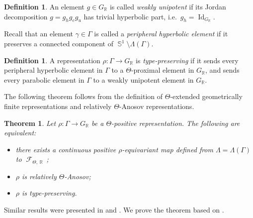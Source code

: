 \documentclass{amsart}
\theoremstyle{plain}
\newtheorem{theorem}[proposition]{Theorem}
\theoremstyle{definition}
\newtheorem{definition}[proposition]{Definition}
\DeclareMathOperator{\Id}{Id}
\DeclareMathOperator{\Fc}{\mathcal{F}}
\DeclareMathOperator{\Rb}{{\mathbb{R}}}
\DeclareMathOperator{\Sb}{\mathbb{S}}
\newcommand{\1}{\mathbf{1}}
\begin{document}
\begin{definition}\label{definition: weakly unipotent}
    An element $g\in G_{\Rb}$ is called \emph{weakly unipotent} if its Jordan decomposition $g= g_h g_e g_u$ has trivial hyperbolic part, i.e.\ $g_h = \Id_{G_{\Rb}}$.
\end{definition}

Recall that an element $\gamma \in \Gamma$ is called a \emph{peripheral hyperbolic element} if it preserves a connected component of $\Sb^1\setminus \Lambda(\Gamma)$.


\begin{definition}
    A representation $\rho \colon \Gamma\to G_{\Rb}$ is \emph{type-preserving} if it sends every peripheral hyperbolic element in $\Gamma$ to a $\Theta$-proximal element in $G_{\Rb}$, and sends every parabolic element in $\Gamma$ to a weakly unipotent element in $G_{\Rb}$.
\end{definition}

The following theorem follows from the definition of $\Theta$-extended geometrically finite representations and relatively $\Theta$-Anosov representations.

\begin{theorem}\label{theorem: positive relatively Anosov}
    Let $\rho \colon \Gamma \to G_{\Rb}$ be a $\Theta$-positive representation. The following are equivalent:
    \begin{itemize}
        \item[(i)]
        \label{theorem: positive relatively Anosov: continuous on Lambda}
        there exists a continuous positive $\rho$-equivariant map defined from $\Lambda=\Lambda(\Gamma)$ to $\Fc_{\Theta,\Rb}$;
        \item[(ii)]
        \label{theorem: positive relatively Anosov: relative Anosov}
        $\rho$ is relatively $\Theta$-Anosov;
        \item[(iii)]
        \label{theorem: positive relatively Anosov: type preserving}
        $\rho$ is type-preserving.
    \end{itemize}
\end{theorem}

Similar results were presented in \cite{CZZ} and \cite{yao2025critical}.
We prove the theorem based on .
\end{document}
